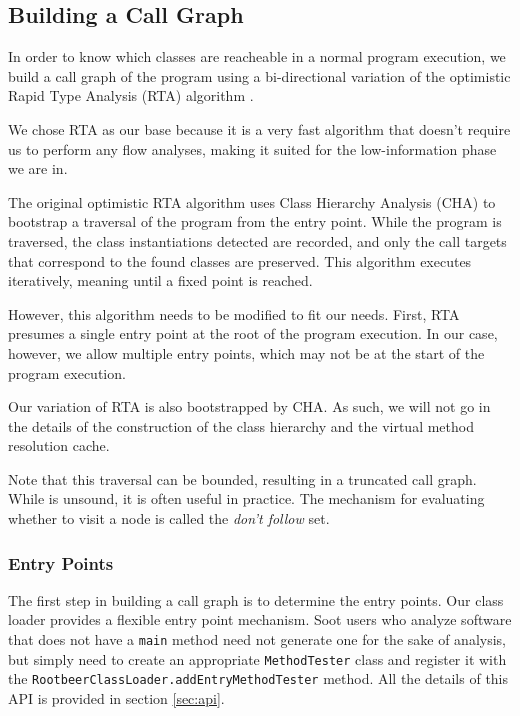 \documentclass[preprint]{sigplanconf}
\begin{document}
\subsection{Building a Call Graph}
\label{sec:cg}
In order to know which classes are reacheable in a normal program execution, we build a call graph of the program using a bi-directional variation of the optimistic Rapid Type Analysis (RTA) algorithm \cite{BaconRTA}.

We chose RTA as our base because it is a very fast algorithm that doesn't require us to perform any flow analyses, making it suited for the low-information phase we are in.

The original optimistic RTA algorithm uses Class Hierarchy Analysis (CHA) \cite{deanetal} to bootstrap a traversal of the program from the entry point. While the program is traversed, the class instantiations detected are recorded, and only the call targets that correspond to the found classes are preserved. This algorithm executes iteratively, meaning until a fixed point is reached.

However, this algorithm needs to be modified to fit our needs. First, RTA presumes a single entry point at the root of the program execution. In our case, however, we allow multiple entry points, which may not be at the start of the program execution. %

Our variation of RTA is also bootstrapped by CHA. As such, we will not go in the details of the construction of the class hierarchy and the virtual method resolution cache.

Note that this traversal can be bounded, resulting in a truncated call graph. While is unsound, it is often useful in practice. The mechanism for evaluating whether to visit a node is called the \emph{don't follow} set.

\subsubsection{Entry Points}
The first step in building a call graph is to determine the entry points. Our class loader provides a flexible entry point mechanism. Soot users who analyze software that does not have a {\tt main} method need not generate one for the sake of analysis, but simply need to create an appropriate {\tt MethodTester} class and register it with the {\tt RootbeerClassLoader.addEntryMethodTester} method. All the details of this API is provided in section \ref{sec:api}.
\end{document}
